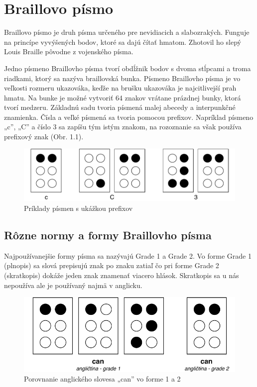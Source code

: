 \documentclass{template/socthesis}
\begin{document}
\chapter{Braillovo písmo}
Braillovo písmo je druh písma určeného pre nevidiacich a slabozrakých. Funguje na princípe vyvýšených bodov, ktoré sa dajú čítať hmatom. Zhotovil ho slepý Louis Braille pôvodne z vojenského písma. 

Jedno písmeno Braillovho písma tvorí obdĺžnik bodov s dvoma stĺpcami a troma riadkami, ktorý sa nazýva braillovská bunka. Písmeno Braillovho písma je vo veľkosti rozmeru ukazováka, keďže na brušku ukazováka je najcitlivejší prah hmatu.
Na bunke je možné vytvoriť 64 znakov vrátane prázdnej bunky, ktorá tvorí medzeru. 
Základnú sadu tvoria písmená malej abecedy a interpunkčné znamienka. Čísla a veľké písmená sa tvoria pomocou prefixov.  Napríklad písmeno „c”,  „C” a číslo 3 sa zapíšu tým istým znakom, na rozoznanie sa však používa prefixový znak (Obr. 1.1).

\begin{center}
	\begin{figure}[htp]
		\centering
		\includegraphics[scale=0.8]{braille}
		\caption{Príklady písmen s ukážkou prefixov}
	\end{figure}
\end{center}

\section{Rôzne normy a formy Braillovho písma}
Najpoužívanejšie formy písma sa nazývajú Grade 1 a Grade 2. Vo forme Grade 1 (plnopis) sa slová prepisujú znak po znaku zatiaľ čo pri forme Grade 2 (skratkopis) dokáže jeden znak znamenať viacero hlások. Skratkopis sa u nás nepoužíva ale je používaný najmä v anglicku.  

\begin{center}
	\begin{figure}[htp]
		\centering
		\includegraphics[scale=1]{brailleGrades}
		\caption{Porovnanie anglického slovesa „can” vo forme 1 a 2}
	\end{figure}
\end{center}
\end{document}
